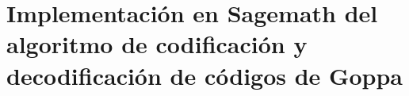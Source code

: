 
\chapter{Implementación en Sagemath del algoritmo de codificación y decodificación de códigos de Goppa}